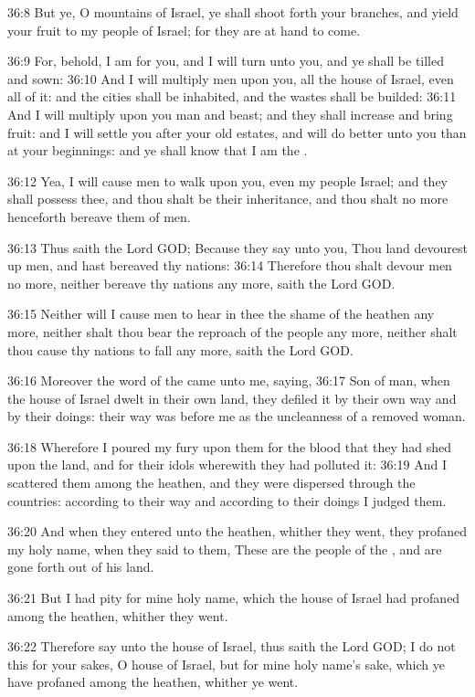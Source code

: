 36:8 But ye, O mountains of Israel, ye shall shoot forth your branches, and yield your fruit to my people of Israel; for they are at hand to come.

36:9 For, behold, I am for you, and I will turn unto you, and ye shall be tilled and sown: 36:10 And I will multiply men upon you, all the house of Israel, even all of it: and the cities shall be inhabited, and the wastes shall be builded: 36:11 And I will multiply upon you man and beast; and they shall increase and bring fruit: and I will settle you after your old estates, and will do better unto you than at your beginnings: and ye shall know that I am the \LORD.

36:12 Yea, I will cause men to walk upon you, even my people Israel; and they shall possess thee, and thou shalt be their inheritance, and thou shalt no more henceforth bereave them of men.

36:13 Thus saith the Lord GOD; Because they say unto you, Thou land devourest up men, and hast bereaved thy nations: 36:14 Therefore thou shalt devour men no more, neither bereave thy nations any more, saith the Lord GOD.

36:15 Neither will I cause men to hear in thee the shame of the heathen any more, neither shalt thou bear the reproach of the people any more, neither shalt thou cause thy nations to fall any more, saith the Lord GOD.

36:16 Moreover the word of the \LORD came unto me, saying, 36:17 Son of man, when the house of Israel dwelt in their own land, they defiled it by their own way and by their doings: their way was before me as the uncleanness of a removed woman.

36:18 Wherefore I poured my fury upon them for the blood that they had shed upon the land, and for their idols wherewith they had polluted it: 36:19 And I scattered them among the heathen, and they were dispersed through the countries: according to their way and according to their doings I judged them.

36:20 And when they entered unto the heathen, whither they went, they profaned my holy name, when they said to them, These are the people of the \LORD, and are gone forth out of his land.

36:21 But I had pity for mine holy name, which the house of Israel had profaned among the heathen, whither they went.

36:22 Therefore say unto the house of Israel, thus saith the Lord GOD; I do not this for your sakes, O house of Israel, but for mine holy name's sake, which ye have profaned among the heathen, whither ye went.

